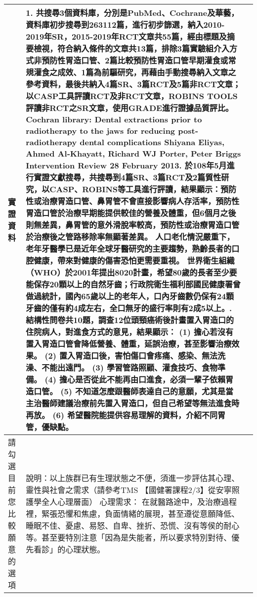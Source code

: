 \documentclass[12pt, a4paper]{article}
\begin{document}
\begin{xltabular}{1.0\linewidth}[c]{|p{2.3cm}|p{12.4cm}|l|}
實證資料 &
  1. 共搜尋3個資料庫，分別是PubMed、Cochrane及華藝，資料庫初步搜尋到263112篇，進行初步篩選，納入2010-2019年SR，2015-2019年RCT文章共55篇，經由標題及摘要檢視，符合納入條件的文章共13篇，排除3篇實驗組介入方式非預防性胃造口管、2篇比較預防性胃造口管早期灌食或常規灌食之成效、1篇為前驅研究，再藉由手動搜尋納入文章之參考資料，最後共納入4篇SR、3篇RCT及5篇非RCT文章；以CASP工具評讀RCT及非RCT文章，ROBINS TOOLS評讀非RCT之SR文章，使用GRADE進行證據品質評比。
Cochran library: Dental extractions prior to radiotherapy to the jaws for reducing post‐radiotherapy dental complications
Shiyana Eliyas, Ahmed Al‐Khayatt, Richard WJ Porter, Peter Briggs
Intervention
Review
28 February 2013. 於108年5月進行實證文獻搜尋，共搜尋到4篇SR、3篇RCT及2篇質性研究，以CASP、ROBINS等工具進行評讀，結果顯示：預防性或治療胃造口管、鼻胃管不會直接影響病人存活率，預防性胃造口管於治療早期能提供較佳的營養及體重，但6個月之後則無差異，鼻胃管的意外滑脫率較高，預防性或治療胃造口管於治療後之管路移除率無顯著差異。\newline
  人口老化情況嚴重下，老年牙醫學已是近年全球牙醫研究的主要趨勢，熟齡長者的口腔健康，帶來對健康的傷害恐怕更需要重視。\newline
    世界衛生組織（WHO）於2001年提出8020計畫，希望80歲的長者至少要能保存20顆以上的自然牙齒；行政院衛生福利部國民健康署曾做過統計，國內65歲以上的老年人，口內牙齒數仍保有24顆牙齒的僅有約4成左右，全口無牙的盛行率則有2成5以上。. 結構性問卷共10題，調查12位頭頸癌術後計畫置入胃造口的住院病人，對進食方式的意見，結果顯示：
(1) 擔心若沒有置入胃造口管會降低營養、體重，延誤治療，甚至影響治療效果。
(2) 置入胃造口後，害怕傷口會疼痛、感染、無法洗澡、不能出遠門。
(3) 學習管路照顧、灌食技巧、食物準備。
(4) 擔心是否從此不能再由口進食，必須一輩子依賴胃造口管。
(5) 不知道怎麼跟醫師表達自己的意願，尤其是當主治醫師建議治療前先置入胃造口，但自己希望等無法進食時再放。
(6) 希望醫院能提供容易理解的資料，介紹不同胃管，優缺點。 &
   \\ \hline
   請勾選目前您比較願意的選項 &
  {\color[HTML]{C0C0C0}說明：以上族群已有生理狀態之不便，須進一步評估其心理、靈性與社會之需求（請參考TMS 【國健署課程2/3】從安寧照護學全人心理層面）}\newline 
  心理需求：\newline
   在就醫路途中，及治療過程裡，緊張恐懼和焦慮，負面情緒的展現，甚至遵從意願降低、睡眠不佳、憂慮、易怒、自卑、挫折、恐慌、沒有等侯的耐心等。甚至要特別注意「因為是失能者，所以要求特別對待、優先看診」的心理狀態。\newline 

\end{xltabular}
\end{document}
